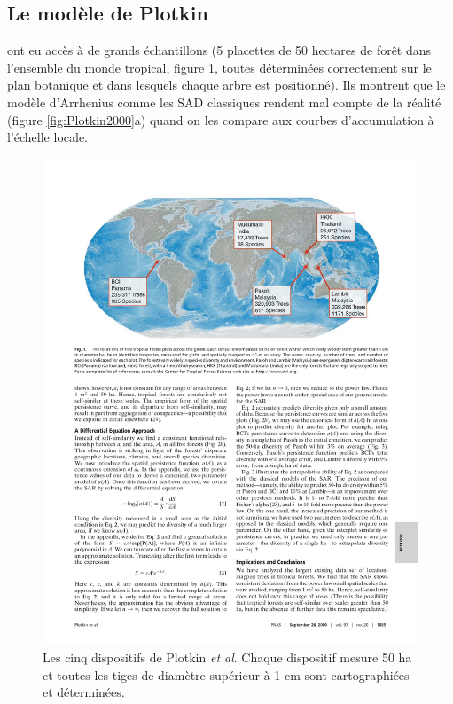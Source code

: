 \documentclass[
  11pt,
  french,
  a4paper,
  extrafontsizes,onecolumn,openright
  ]{memoir}
\begin{document}
\subsection{Le modèle de Plotkin}\label{le-moduxe8le-de-plotkin}

\textcite{Plotkin2000} ont eu accès à de grands échantillons (5 placettes de 50 hectares de forêt dans l'ensemble du monde tropical, figure \ref{fig:CTFS}, toutes déterminées correctement sur le plan botanique et dans lesquels chaque arbre est positionné).
Ils montrent que le modèle d'Arrhenius comme les SAD classiques rendent mal compte de la réalité (figure \ref{fig:Plotkin2000}a) quand on les compare aux courbes d'accumulation à l'échelle locale.



\scriptsize

\begin{figure}

{\centering \includegraphics[width=0.8\linewidth]{images/CTFS} 

}

\caption{Les cinq dispositifs de Plotkin \emph{et al}. Chaque dispositif mesure 50 ha et toutes les tiges de diamètre supérieur à 1 cm sont cartographiées et déterminées.}\label{fig:CTFS}
\end{figure}
\end{document}
